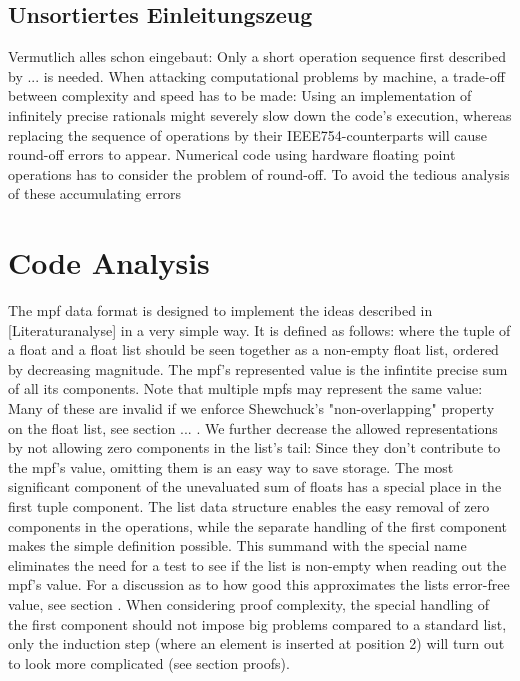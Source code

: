 \documentclass[11pt,a4paper]{article}
\begin{document}
\subsection{Unsortiertes Einleitungszeug}
Vermutlich alles schon eingebaut:
Only a short operation sequence first described by ... is needed.
When attacking computational problems by machine, a trade-off between complexity and speed has to be made: Using an implementation of infinitely precise rationals might severely slow down the code's execution, whereas replacing the sequence of operations by their IEEE754-counterparts will cause round-off errors to appear. Numerical code using hardware floating point operations has to consider the problem of round-off. To avoid the tedious analysis of these accumulating errors

\section{Code Analysis}

The mpf data format is designed to implement the ideas described in [Literaturanalyse] in a very simple way. It is defined as follows:
\mpfdef
where the tuple of a float and a float list should be seen together as a non-empty float list, ordered by decreasing magnitude. The mpf's represented value is the infintite precise sum of all its components. Note that multiple mpfs may represent the same value:
Many of these are invalid if we enforce Shewchuck's "non-overlapping" property on the float list, see section ... . We further decrease the allowed representations by not allowing zero components in the list's tail: Since they don't contribute to the mpf's value, omitting them is an easy way to save storage.
The most significant component of the unevaluated sum of floats has a special place in the first tuple component. The list data structure enables the easy removal of zero components in the operations, while the separate handling of the first component makes the simple definition
\newline
\approxdef
\newline
possible. This summand with the special name \constapprox eliminates the need for a test to see if the list is non-empty when reading out the mpf's value. For a discussion as to how good this approximates the lists error-free value, see section     . When considering proof complexity, the special handling of the first component should not impose big problems compared to a standard list, only the induction step (where an element is inserted at position 2) will turn out to look more complicated (see section proofs).
\end{document}
